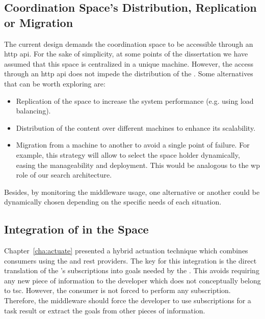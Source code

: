 \subsection{Coordination Space's Distribution, Replication or Migration} %

The current design demands the coordination space to be accessible through an \ac{http} \ac{api}.
For the sake of simplicity, at some points of the dissertation we have assumed that this space is centralized in a unique machine.
However, the access through an \ac{http} \ac{api} does not impede the distribution of the \coordspace{}.
Some alternatives that can be worth exploring are: %
\begin{itemize}
  \item Replication of the space to increase the system performance (e.g. using load balancing).
  \item Distribution of the content over different machines to enhance its scalability. %
  \item Migration from a machine to another to avoid a single point of failure.
        For example, this strategy will allow to select the space holder dynamically, easing the \coordspace{} manageability and deployment.
        This would be analogous to the \ac{wp} role of our search architecture. %
\end{itemize}

Besides, by monitoring the middleware usage, one alternative or another could be dynamically chosen depending on the specific needs of each situation.


\subsection{Integration of \restActuation{} in the Space}

Chapter~\ref{cha:actuate} presented a hybrid actuation technique which combines consumers using the \spaceActuation{} and \ac{rest} providers.
The key for this integration is the direct translation of the \coordspace{}'s subscriptions into goals needed by the \restActuation{}.
This avoids requiring any new piece of information to the developer which does not conceptually belong to \ac{tsc}.
However, the consumer is not forced to perform any subscription.
Therefore, the middleware should force the developer to use subscriptions for a task result or extract the goals from other pieces of information.


